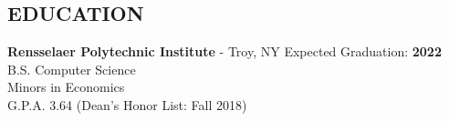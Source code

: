 \documentclass{res}
\begin{document}
 


\address{\bf  ADDRESS\\11 Riverside Drive APT 7WE\\New York, NY 10023}
\address{\bf Contact Info \\ eli@elischiff.org \\   (646) 574-5224}
                                  
\begin{resume}


\section{EDUCATION}          
    {\bf Rensselaer Polytechnic Institute} - Troy, NY \hfill Expected Graduation: {\bf 2022} \\        
    B.S. Computer Science   \\    
    Minors in Economics  \\        
    G.P.A. 3.64 (Dean’s Honor List: Fall 2018)

 

\end{resume}
\end{document}
